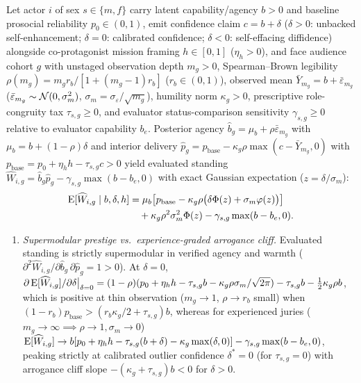 \begin{proposition}\label{prop:prestige}
Let actor $i$ of sex $s\in\{m,f\}$ carry latent capability/agency $b>0$ and baseline prosocial reliability $p_0\in(0,1)$, emit confidence claim $c=b+\delta$ ($\delta>0$: unbacked self-enhancement; $\delta=0$: calibrated confidence; $\delta<0$: self-effacing diffidence) alongside co-protagonist mission framing $h\in[0,1]$ ($\eta_h>0$), and face audience cohort $g$ with unstaged observation depth $m_g>0$, Spearman--Brown legibility $\rho(m_g)=m_g r_b/[1+(m_g-1)r_b]$ ($r_b\in(0,1)$), observed mean $\bar Y_{m_g}=b+\bar\varepsilon_{m_g}$ ($\bar\varepsilon_{m_g}\sim\mathcal{N}(0,\sigma_m^2)$, $\sigma_m=\sigma_\varepsilon/\sqrt{m_g}$), humility norm $\kappa_g>0$, prescriptive role-congruity tax $\tau_{s,g}\ge 0$, and evaluator status-comparison sensitivity $\gamma_{s,g}\ge 0$ relative to evaluator capability $b_e$. Posterior agency $\hat b_g=\mu_b+\rho\bar\varepsilon_{m_g}$ with $\mu_b=b+(1-\rho)\delta$ and interior delivery $\hat p_g=p_{\mathrm{base}}-\kappa_g\rho\max(c-\bar Y_{m_g},0)$ with $p_{\mathrm{base}}=p_0+\eta_h h-\tau_{s,g}c>0$ yield evaluated standing $\widehat W_{i,g}=\hat b_g\hat p_g-\gamma_{s,g}\max(b-b_e,0)$ with exact Gaussian expectation ($z=\delta/\sigma_m$):
\begin{equation}
\begin{aligned}
\operatorname{E}[\widehat W_{i,g}\mid b,\delta,h]&=\mu_b\big[p_{\mathrm{base}}-\kappa_g\rho\big(\delta\Phi(z)+\sigma_m\varphi(z)\big)\big]\\
&\quad+\kappa_g\rho^2\sigma_m^2\Phi(z)-\gamma_{s,g}\max(b-b_e,0).
\end{aligned}\label{eq:prestige}
\end{equation}
\begin{enumerate}[leftmargin=1.5em,itemsep=1pt,topsep=2pt]
\item[(i)] \emph{Supermodular prestige vs.\ experience-graded arrogance cliff.} Evaluated standing is strictly supermodular in verified agency and warmth ($\partial^2\widehat W_{i,g}/\partial\hat b_g\,\partial\hat p_g=1>0$). At $\delta=0$, $\partial\operatorname{E}[\widehat W_{i,g}]/\partial\delta\big|_{\delta=0}=(1-\rho)(p_0+\eta_h h-\tau_{s,g}b-\kappa_g\rho\sigma_m/\sqrt{2\pi})-\tau_{s,g}b-\tfrac12\kappa_g\rho b$, which is positive at thin observation ($m_g\to 1$, $\rho\to r_b$ small) when $(1-r_b)p_{\mathrm{base}}>(r_b\kappa_g/2+\tau_{s,g})b$, whereas for experienced juries ($m_g\to\infty\implies\rho\to 1,\sigma_m\to 0$) $\operatorname{E}[\widehat W_{i,g}]\to b[p_0+\eta_h h-\tau_{s,g}(b+\delta)-\kappa_g\max(\delta,0)]-\gamma_{s,g}\max(b-b_e,0)$, peaking strictly at calibrated outlier confidence $\delta^*=0$ (for $\tau_{s,g}=0$) with arrogance cliff slope $-(\kappa_g+\tau_{s,g})b<0$ for $\delta>0$.

\end{enumerate}
\end{proposition}
